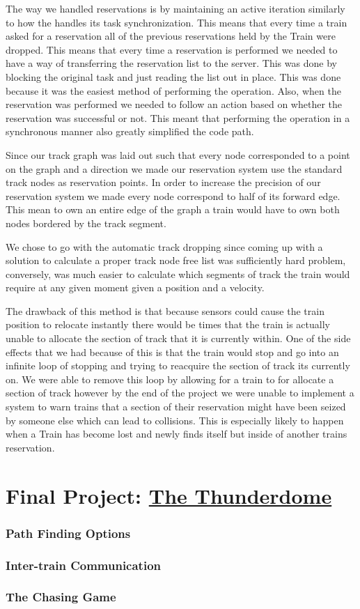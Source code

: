 \documentclass[pdftex,10pt,a4paper]{article}
\begin{document}
The way we handled reservations is by maintaining an active iteration similarly
to how the  handles its task synchronization. This means that
every time a train asked for a reservation all of the previous reservations held
by the Train were dropped. This means that every time a reservation is performed
we needed to have a way of transferring the reservation list to the server. This
was done by blocking the original task and just reading the list out in place.
This was done because it was the easiest method of performing the operation.
Also, when the reservation was performed we needed to follow an action based on
whether the reservation was successful or not. This meant that performing the
operation in a synchronous manner also greatly simplified the code path.

Since our track graph was laid out such that every node corresponded to a point
on the graph and a direction we made our reservation system use the standard
track nodes as reservation points. In order to increase the precision of our
reservation system we made every node correspond to half of its forward edge.
This mean to own an entire edge of the graph a train would have to own both
nodes bordered by the track segment.

We chose to go with the automatic track dropping since coming up with a solution
to calculate a proper track node free list was sufficiently hard problem,
conversely, was much easier to calculate which segments of track the train would
require at any given moment given a position and a velocity.

The drawback of this method is that because sensors could cause the train
position to relocate instantly there would be times that the train is actually
unable to allocate the section of track that it is currently within. One of the
side effects that we had because of this is that the train would stop and go
into an infinite loop of stopping and trying to reacquire the section of track
its currently on. We were able to remove this loop by allowing for a train to
for allocate a section of track however by the end of the project we were unable
to implement a system to warn trains that a section of their reservation might
have been seized by someone else which can lead to collisions. This is
especially likely to happen when a Train has become lost and newly finds itself
but inside of another trains reservation.

\part*{Final Project: \underline{The Thunderdome}}

\section*{Path Finding Options}

\section*{Inter-train Communication}

\section*{The Chasing Game}
\end{document}
